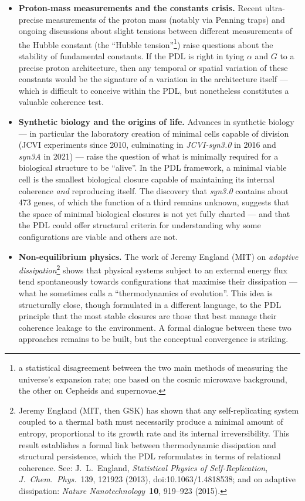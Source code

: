 \documentclass[11pt, a4paper, openright]{book}
\begin{document}
\begin{itemize}
\item \textbf{Proton-mass measurements and the constants crisis.} Recent ultra-precise measurements of the proton mass (notably via Penning traps) and ongoing discussions about slight tensions between different measurements of the Hubble constant (the “Hubble tension”\footnote{a statistical disagreement between the two main methods of measuring the universe’s expansion rate; one based on the cosmic microwave background, the other on Cepheids and supernovae.}) raise questions about the stability of fundamental constants. If the PDL is right in tying $\alpha$ and $G$ to a precise proton architecture, then any temporal or spatial variation of these constants would be the signature of a variation in the architecture itself — which is difficult to conceive within the PDL, but nonetheless constitutes a valuable coherence test.

\item \textbf{Synthetic biology and the origins of life.} Advances in synthetic biology — in particular the laboratory creation of minimal cells capable of division (JCVI experiments since 2010, culminating in \textit{JCVI-syn3.0} in 2016 and \textit{syn3A} in 2021) — raise the question of what is minimally required for a biological structure to be “alive”. In the PDL framework, a minimal viable cell is the smallest biological closure capable of maintaining its internal coherence \emph{and} reproducing itself. The discovery that \textit{syn3.0} contains about 473 genes, of which the function of a third remains unknown, suggests that the space of minimal biological closures is not yet fully charted — and that the PDL could offer structural criteria for understanding why some configurations are viable and others are not.

\item \textbf{Non-equilibrium physics.} The work of Jeremy England (MIT) on \emph{adaptive dissipation}\footnote{Jeremy England (MIT, then GSK) has shown that any self-replicating system coupled to a thermal bath must necessarily produce a minimal amount of entropy, proportional to its growth rate and its internal irreversibility. This result establishes a formal link between thermodynamic dissipation and structural persistence, which the PDL reformulates in terms of relational coherence. See: J.~L.~England, \textit{Statistical Physics of Self-Replication}, \textit{J.~Chem.~Phys.}~139, 121923 (2013), doi:10.1063/1.4818538; and on adaptive dissipation: \textit{Nature Nanotechnology}~\textbf{10}, 919–923 (2015).} shows that physical systems subject to an external energy flux tend spontaneously towards configurations that maximise their dissipation — what he sometimes calls a “thermodynamics of evolution”. This idea is structurally close, though formulated in a different language, to the PDL principle that the most stable closures are those that best manage their coherence leakage to the environment. A formal dialogue between these two approaches remains to be built, but the conceptual convergence is striking.

\end{itemize}
\end{document}

